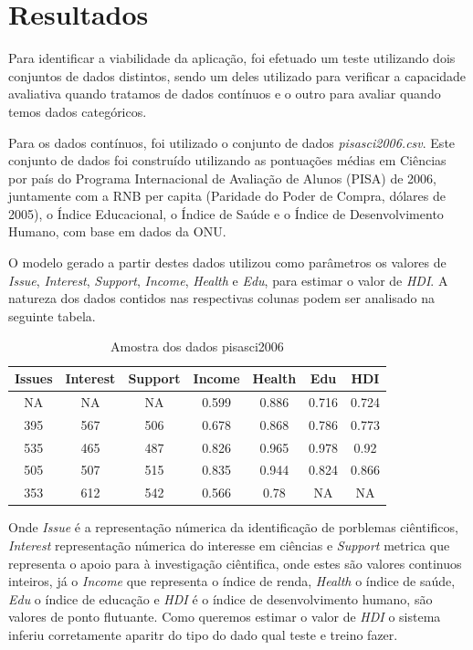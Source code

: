 \documentclass[
    12pt,               %
    openright,          %
    oneside,            %
    a4paper,            %
    english,            %
    brazil              %
    ]{abntex2}
\begin{document}
\chapter{Resultados}

Para identificar a viabilidade da aplicação, foi efetuado um teste utilizando dois conjuntos de dados 
distintos, sendo um deles utilizado para verificar a capacidade avaliativa quando tratamos de dados
contínuos e o outro para avaliar quando temos dados categóricos.

Para os dados contínuos, foi utilizado o conjunto de dados \textit{pisasci2006.csv}. Este conjunto 
de dados foi construído utilizando as pontuações médias em Ciências por país do Programa Internacional 
de Avaliação de Alunos (PISA) de 2006, juntamente com a RNB per capita (Paridade do Poder de Compra, 
dólares de 2005), o Índice Educacional, o Índice de Saúde e o Índice de Desenvolvimento Humano, 
com base em dados da ONU.

O modelo gerado a partir destes dados utilizou como parâmetros os valores de \textit{Issue}, \textit{Interest},
\textit{Support}, \textit{Income}, \textit{Health} e \textit{Edu}, para estimar o valor de \textit{HDI}.
A natureza dos dados contidos nas respectivas colunas podem ser analisado na seguinte tabela.

\begin{table}[h!]
    \centering
    \caption{Amostra dos dados pisasci2006}
    \label{tab:pisasci2006}
    \begin{tabular}{|c|c|c|c|c|c|c|}
        \hline
        \textbf{Issues} & \textbf{Interest} & \textbf{Support} & \textbf{Income} & \textbf{Health} & \textbf{Edu} & \textbf{HDI} \\ \hline
        NA & NA & NA & 0.599 & 0.886 & 0.716 & 0.724 \\ \hline
        395 & 567 & 506 & 0.678 & 0.868 & 0.786 & 0.773 \\ \hline
        535 & 465 & 487 & 0.826 & 0.965 & 0.978 & 0.92 \\ \hline
        505 & 507 & 515 & 0.835 & 0.944 & 0.824 & 0.866 \\ \hline
        353 & 612 & 542 & 0.566 & 0.78 & NA & NA \\ \hline
    \end{tabular}
\end{table}

Onde \textit{Issue} é a representação númerica da identificação de porblemas ciêntificos, \textit{Interest} representação 
númerica do interesse em ciências e \textit{Support} metrica que representa o apoio para à investigação ciêntifica, onde
estes são valores continuos inteiros, já o \textit{Income} que representa o índice de renda, \textit{Health} o índice de saúde, 
\textit{Edu} o índice de educação e \textit{HDI} é o índice de desenvolvimento humano, são valores de ponto flutuante. Como 
queremos estimar o valor de \textit{HDI} o sistema inferiu corretamente aparitr do tipo do dado qual teste e treino fazer.
\end{document}
